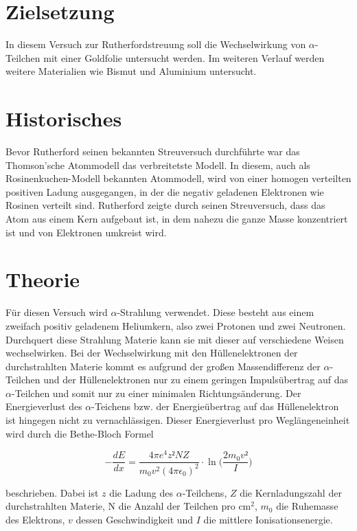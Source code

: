 \section{Zielsetzung}
In diesem Versuch zur Rutherfordstreuung soll die Wechselwirkung von $\alpha$-Teilchen mit einer Goldfolie untersucht werden.
Im weiteren Verlauf werden weitere Materialien wie Bismut und Aluminium untersucht.

\section{Historisches}
Bevor Rutherford seinen bekannten Streuversuch durchführte war das Thomson'sche Atommodell das verbreitetste Modell. In diesem,
auch als Rosinenkuchen-Modell bekannten Atommodell, wird von einer homogen verteilten positiven Ladung ausgegangen, in der die
negativ geladenen Elektronen wie Rosinen verteilt sind. Rutherford zeigte durch seinen Streuversuch, dass das Atom aus einem
Kern aufgebaut ist, in dem nahezu die ganze Masse konzentriert ist und von Elektronen umkreist wird.

\section{Theorie}
Für diesen Versuch wird $\alpha$-Strahlung verwendet. Diese besteht aus einem zweifach positiv geladenem Heliumkern, also
zwei Protonen und zwei Neutronen. Durchquert  diese Strahlung Materie kann sie mit dieser auf verschiedene Weisen wechselwirken.
Bei der Wechselwirkung mit den Hüllenelektronen der durchstrahlten Materie kommt es aufgrund der großen Massendifferenz der
$\alpha$-Teilchen und der Hüllenelektronen nur zu einem geringen Impulsübertrag auf das $\alpha$-Teilchen und somit nur zu einer
minimalen Richtungsänderung. Der Energieverlust des $\alpha$-Teichens bzw. der Energieübertrag auf das Hüllenelektron ist
hingegen nicht zu vernachlässigen. Dieser Energieverlust pro Weglängeneinheit wird durch die Bethe-Bloch Formel

\begin{equation}
  -\frac{dE}{dx}=\frac{4\pi e^4 z²NZ}{m_0 v^2 (4\pi \epsilon_0)^2}\cdot\ln\Bigg(\frac{2m_0 v²}{I}\Bigg)
  \label{eqn:BetheBloch}
\end{equation}

beschrieben.
Dabei ist $z$ die Ladung des $\alpha$-Teilchens, $Z$ die Kernladungszahl der durchstrahlten Materie, N die Anzahl der
Teilchen pro $\si{\cm\squared}$, $m_0$ die Ruhemasse des Elektrons, $v$ dessen Geschwindigkeit und $I$ die mittlere
Ionisationsenergie.

